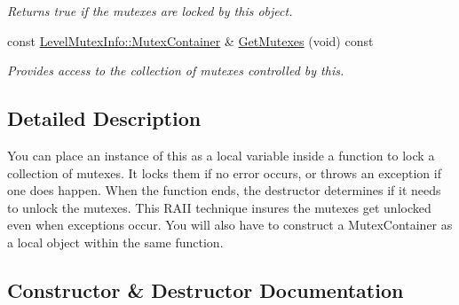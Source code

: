 \begin{DoxyCompactItemize}
\begin{DoxyCompactList}\small\item\em Returns true if the mutexes are locked by this object. \end{DoxyCompactList}\item 
\hypertarget{classLoki_1_1MultiMutexLocker_a1b95c9bfa8ff0737d0afd67d9820f67f}{}const \hyperlink{classLoki_1_1LevelMutexInfo_a76a0315d91234f5066c75660a9f27a7f}{Level\+Mutex\+Info\+::\+Mutex\+Container} \& \hyperlink{classLoki_1_1MultiMutexLocker_a1b95c9bfa8ff0737d0afd67d9820f67f}{Get\+Mutexes} (void) const \label{classLoki_1_1MultiMutexLocker_a1b95c9bfa8ff0737d0afd67d9820f67f}

\begin{DoxyCompactList}\small\item\em Provides access to the collection of mutexes controlled by this. \end{DoxyCompactList}\end{DoxyCompactItemize}


\subsection{Detailed Description}
You can place an instance of this as a local variable inside a function to lock a collection of mutexes. It locks them if no error occurs, or throws an exception if one does happen. When the function ends, the destructor determines if it needs to unlock the mutexes. This R\+A\+I\+I technique insures the mutexes get unlocked even when exceptions occur. You will also have to construct a Mutex\+Container as a local object within the same function. 

\subsection{Constructor \& Destructor Documentation}
\hypertarget{classLoki_1_1MultiMutexLocker_aaa646ae058e3273651f89bfbb276cf42}{}
